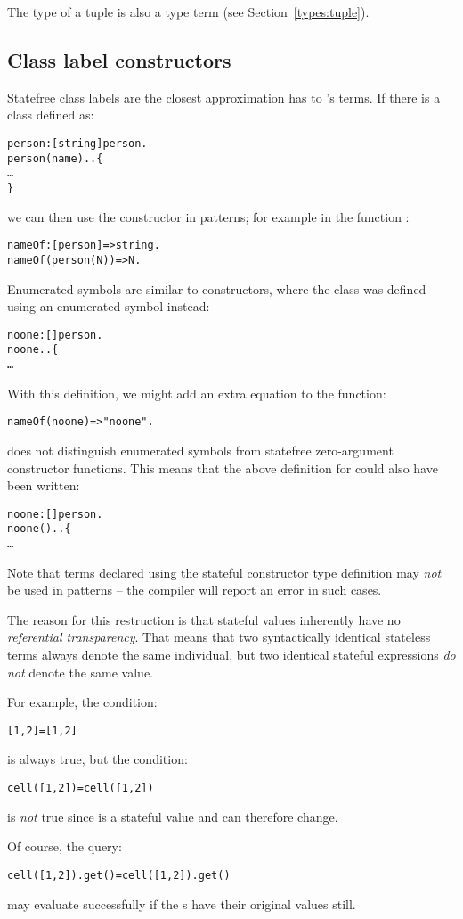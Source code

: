 The type of a tuple is also a \q{,} type term (see Section~\vref{types:tuple}).


\subsection{Class label constructors}
\label{pattern:constructor}
Statefree class labels are the closest approximation \go has to \prolog's terms. If there is a class defined as:
\begin{alltt}
person:[string] \conarrow person.
person(name)..\{
  \ldots
\}
\end{alltt}
we can then use the  constructor in patterns; for example in the function :
\begin{alltt}
nameOf:[person]=>string.
nameOf(person(N))=>N.
\end{alltt}

Enumerated symbols are similar to constructors, where the class was defined using an enumerated symbol instead:
\begin{alltt}
noone:[] \conarrow person.
noone..\{
  \ldots
\end{alltt}
With this definition, we might add an extra equation to the  function:
\begin{alltt}
nameOf(noone) => "noone".
\end{alltt}
\begin{aside}
\go does not distinguish enumerated symbols from statefree ze\-ro-ar\-gu\-ment constructor functions. This means that the above definition for  could also have been written:
\begin{alltt}
noone:[] \conarrow person.
noone()..\{
  \ldots
\end{alltt}
\end{aside}

Note that terms declared using the stateful constructor type definition may \emph{not} be used in patterns -- the compiler will report an error in such cases.

\begin{aside}
The reason for this restruction is that stateful values inherently have no \emph{referential transparency}. That means that two syntactically identical stateless terms always denote the same individual, but two identical stateful expressions \emph{do not} denote the same value.

For example, the condition:
\begin{alltt}
[1,2] = [1,2]
\end{alltt}
is always true, but the condition:
\begin{alltt}
cell([1,2]) = cell([1,2])
\end{alltt}
is \emph{not} true since  is a stateful value and can therefore change.

Of course, the query:
\begin{alltt}
cell([1,2]).get() = cell([1,2]).get()
\end{alltt}
may evaluate successfully if the s have their original values still.
\end{aside}

